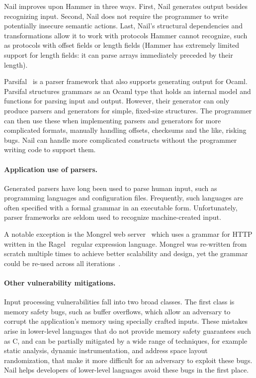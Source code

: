 Nail improves upon Hammer in three ways. First, Nail  generates output besides recognizing input.
Second, Nail does not require the programmer to write potentially insecure semantic actions. Last,
Nail's structural dependencies and transformations allow it to work with protocols Hammer cannot recognize, such as
protocols with offset fields or length fields (Hammer has extremely limited support for length
fields: it can parse arrays immediately preceded by their length).

Parsifal~\cite{ANSSI:parsifal} is a parser framework that also supports generating output for Ocaml.
Parsifal structures grammars as an Ocaml type that holds an internal model and functions for parsing
input and output.
However, their generator can only produce parsers and generators for simple, fixed-size structures.
The programmer can then use these when implementing parsers and generators for more
complicated formats, manually handling offsets, checksums and the like, risking bugs. Nail can
handle more complicated constructs without the programmer writing code to support them.

\paragraph{Application use of parsers.}
Generated parsers have long been used to parse human input, such as programming languages and
configuration files. Frequently, such languages are often specified with a formal grammar in an
executable form. Unfortunately,  parser frameworks are seldom used  to recognize
machine-created input.

A notable exception is the Mongrel
web server~\cite{mongrel} which uses a grammar
for HTTP written in the Ragel~\cite{ragel-paper} regular expression
language. Mongrel was re-written from scratch multiple times to achieve
better scalability and design, yet the grammar could be  re-used across
all iterations~\cite{patterson-citation}.

\paragraph{Other vulnerability mitigations.}

Input processing vulnerabilities fall into two broad classes.  The first
class is memory safety bugs, such as buffer overflows, which allow an
adversary to corrupt the application's memory using specially crafted
inputs.  These mistakes arise in lower-level languages that do not
provide memory safety guarantees such as C, and can be partially
mitigated by a wide range of techniques, for example static analysis,
dynamic instrumentation, and address space layout randomization, that
make it more difficult for an adversary to exploit these bugs.
Nail helps developers of lower-level languages avoid these bugs
in the first place.

